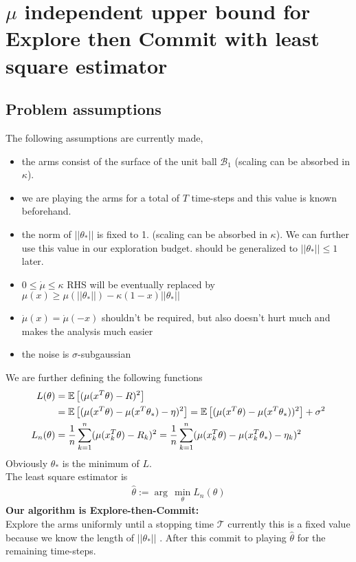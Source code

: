 \section{$\mu$ independent upper bound for Explore then Commit with least square estimator}
\subsection{Problem assumptions}
The following assumptions are currently made, 
\begin{itemize}
\item the arms consist of the surface of the unit ball $\mathcal{B}_1$ (scaling can be absorbed in $\kappa$).
\item we are playing the arms for a total of $T$ time-steps and this value is known beforehand.
\item the norm of $||\theta_*||$ is fixed to 1. (scaling can be absorbed in $\kappa$). We can further use this value in our exploration budget. \color{red}should be generalized to $||\theta_*||\leq 1$ later.\color{black}
\item $0\leq\dot{\mu}\leq \kappa$ \color{red}RHS will be eventually replaced by $\mu(x)\geq \mu(||\theta_*||)-\kappa(1-x)||\theta_*||$\color{black}
\item $\dot{\mu}(x)=\dot{\mu}(-x)$ \color{red}shouldn't be required, but also doesn't hurt much and makes the analysis much easier\color{black}
\item the noise is $\sigma$-subgaussian 
\end{itemize}

We are further defining the following functions
\begin{align}
    L(\theta) &= \mathbb{E}\left[(\mu(x^T\theta)-R)^2\right]\nonumber\\
    &= \mathbb{E}\left[(\mu(x^T\theta)-\mu(x^T\theta_*)-\eta)^2\right]=\mathbb{E}\left[(\mu(x^T\theta)-\mu(x^T\theta_*))^2\right]+\sigma^2\\
    L_n(\theta) &= \frac{1}{n}\sum_{k=1}^n(\mu(x_k^T\theta)-R_k)^2= \frac{1}{n}\sum_{k=1}^n(\mu(x_k^T\theta)-\mu(x_k^T\theta_*)-\eta_k)^2
\end{align}
Obviously $\theta_*$ is the minimum of $L$.\\
The least square estimator is
\begin{align}
    \hat{\theta} := \arg\,\min_{\theta} L_n(\theta)
\end{align}
\textbf{Our algorithm is Explore-then-Commit:}\\
Explore the arms uniformly until a stopping time $\mathcal{T}$ \color{red}currently this is a fixed value because we know the length of $||\theta_*||$ \color{black}. After this commit to playing $\hat{\theta}$ for the remaining time-steps.
